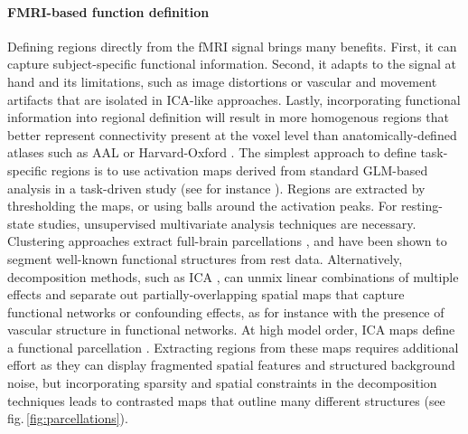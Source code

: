 \documentclass[5p]{elsarticle}
\begin{document}
\paragraph{FMRI-based function definition}
%
Defining regions directly from the fMRI signal brings many benefits.
First, it can capture subject-specific functional information. Second, it
adapts to the signal at hand and its limitations, such as
image distortions or vascular and movement artifacts that are isolated
in ICA-like approaches. Lastly, incorporating functional information into
regional definition will result in more homogenous regions that better represent
connectivity present at the voxel level than anatomically-defined atlases such
as AAL or Harvard-Oxford \cite{craddock2012}. The simplest approach to define task-specific
regions is to use activation maps derived from standard GLM-based
analysis in a task-driven study (see for instance \cite{poldrack2011}).
Regions are extracted by thresholding the maps, or using balls around the
activation peaks. For resting-state studies, unsupervised multivariate
analysis techniques are necessary. Clustering approaches extract
full-brain parcellations \cite{craddock2012,bellec2010,yeo2011,thirion2006}, and have been shown to segment well-known functional
structures from rest data. Alternatively, decomposition
methods, such as ICA \cite{beckmann2004}, can unmix linear
combinations of multiple effects and separate out partially-overlapping
spatial maps
that capture functional networks or confounding effects, as for instance
with the presence of vascular structure in functional networks. At high model
order, ICA maps define a functional parcellation \cite{kiviniemi2009}.
Extracting regions from these maps requires additional effort as they can
display fragmented spatial features and structured background noise, but
incorporating sparsity and spatial constraints in the decomposition
techniques leads to contrasted maps that outline many different
structures \cite{varoquaux2012} (see fig.\,\ref{fig:parcellations}).
\end{document}
